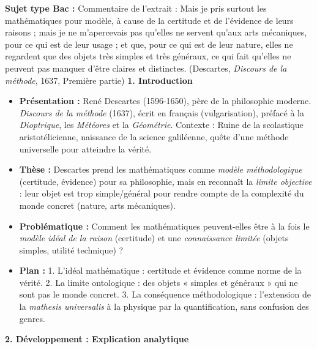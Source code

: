 \documentclass[11pt]{article}
\begin{document}
\begin{exoresolu}
    \textbf{Sujet type Bac :} Commentaire de l'extrait :
    \guillemotleft Mais je pris surtout les mathématiques pour modèle, à cause de la certitude et de l'évidence de leurs raisons ; mais je ne m'apercevais pas qu'elles ne servent qu'aux arts mécaniques, pour ce qui est de leur usage ; et que, pour ce qui est de leur nature, elles ne regardent que des objets très simples et très généraux, ce qui fait qu'elles ne peuvent pas manquer d'être claires et distinctes. \guillemotright
    (Descartes, \emph{Discours de la méthode}, 1637, Première partie)
    \tcblower
    \textbf{1. Introduction}
    \begin{itemize}
        \item \textbf{Présentation :} René Descartes (1596-1650), père de la philosophie moderne. \emph{Discours de la méthode} (1637), écrit en français (vulgarisation), préfacé à la \emph{Dioptrique}, les \emph{Météores} et la \emph{Géométrie}. Contexte : Ruine de la scolastique aristotélicienne, naissance de la science galiléenne, quête d'une méthode universelle pour atteindre la vérité.
        \item \textbf{Thèse :} Descartes prend les mathématiques comme \emph{modèle méthodologique} (certitude, évidence) pour sa philosophie, mais en reconnaît la \emph{limite objective} : leur objet est trop simple/général pour rendre compte de la complexité du monde concret (nature, arts mécaniques).
        \item \textbf{Problématique :} Comment les mathématiques peuvent-elles être à la fois le \emph{modèle idéal de la raison} (certitude) et une \emph{connaissance limitée} (objets simples, utilité technique) ?
        \item \textbf{Plan :} 1. L'idéal mathématique : certitude et évidence comme norme de la vérité. 2. La limite ontologique : des objets « simples et généraux » qui ne sont pas le monde concret. 3. La conséquence méthodologique : l'extension de la \emph{mathesis universalis} à la physique par la quantification, sans confusion des genres.
    \end{itemize}

    \textbf{2. Développement : Explication analytique}


\end{exoresolu}
\end{document}

